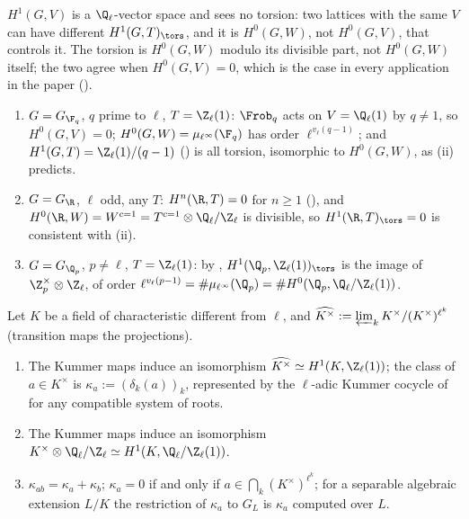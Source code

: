 \begin{warning}\label{warn:galcoh:torsion}
$H^1(G,V)$ is a $\Q_\ell$-vector space and sees no torsion: two lattices with the same $V$ can have different $H^1(G,T)_{\tors}$, and it is $H^0(G,W)$, not $H^0(G,V)$,
that controls it. The torsion is $H^0(G,W)$ modulo its divisible part, not $H^0(G,W)$ itself; the two agree when $H^0(G,V)=0$, which is the case in every application
in the paper ().
\end{warning}

\begin{example}\label{ex:galcoh:tvw-examples}
\begin{enumerate}[label=(\alph*)]
\item $G=G_{\F_q}$, $q$ prime to $\ell$, $T=\Z_\ell(1)$: $\Frob_q$ acts on $V=\Q_\ell(1)$ by $q\ne1$, so $H^0(G,V)=0$; $H^0(G,W)=\mu_{\ell^\infty}(\F_q)$ has order $\ell^{v_\ell(q-1)}$; and
$H^1(G,T)=\Z_\ell(1)/(q-1)$ () is all torsion, isomorphic to $H^0(G,W)$, as (ii) predicts.
\item $G=G_\R$, $\ell$ odd, any $T$: $H^n(\R,T)=0$ for $n\ge1$ (), and $H^0(\R,W)=W^{c=1}=T^{c=1}\otimes\Q_\ell/\Z_\ell$ is divisible, so
$H^1(\R,T)_{\tors}=0$ is consistent with (ii).
\item $G=G_{\Q_p}$, $p\ne\ell$, $T=\Z_\ell(1)$: by , $H^1(\Q_p,\Z_\ell(1))_{\tors}$ is the image of $\Z_p^\times\otimes\Z_\ell$, of order
$\ell^{v_\ell(p-1)}=\#\mu_{\ell^\infty}(\Q_p)=\#H^0(\Q_p,\Q_\ell/\Z_\ell(1))$.
\end{enumerate}
\end{example}

\begin{theorem}\label{thm:galcoh:kummer-ladic}
Let $K$ be a field of characteristic different from $\ell$, and $\widehat{K^\times}:=\varprojlim_kK^\times/(K^\times)^{\ell^k}$ (transition maps the projections).
\begin{enumerate}[label=(\roman*)]
\item The Kummer maps induce an isomorphism $\widehat{K^\times}\simeq H^1(K,\Z_\ell(1))$; the class of $a\in K^\times$ is $\kappa_a:=(\delta_k(a))_k$, represented by the
$\ell$-adic Kummer cocycle of  for any compatible system of roots.
\item The Kummer maps induce an isomorphism $K^\times\otimes\Q_\ell/\Z_\ell\simeq H^1(K,\Q_\ell/\Z_\ell(1))$.
\item $\kappa_{ab}=\kappa_a+\kappa_b$; $\kappa_a=0$ if and only if $a\in\bigcap_k(K^\times)^{\ell^k}$; for a separable algebraic extension $L/K$ the restriction of $\kappa_a$ to
$G_L$ is $\kappa_a$ computed over $L$.
\end{enumerate}
\end{theorem}

